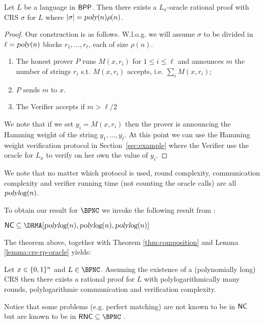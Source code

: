 \begin{lemma}
	\label{lemma:crs-rp-oracle}
	Let $L$ be a language in ${\mathsf{BPP}}$. Then there exists a $L_x$-oracle rational proof with CRS $\sigma$ for $L$ where $|\sigma|={\textsl{poly}}(n) \rho(n)$. 
\end{lemma}
\begin{proof}
Our construction is as follows. W.l.o.g. we will assume $\sigma$ to be divided in 
$\ell={\textsl{poly}}(n)$  blocks  $r_1,...,r_\ell$, each of size $\rho(n)$. 
\begin{enumerate}
\item The honest prover $P$ runs $M(x,r_i)$ for $1 \leq i \leq \ell$ and announces $m$ 
the number of strings $r_i$ s.t. $M(x,r_i)$ accepts, i.e. $\sum_i M(x,r_i)$; 
\item $P$ sends $m$ to $x$.
\item The Verifier accepts if $m>\ell/2$
\end{enumerate}
We note that if we set $y_i=M(x,r_i)$ then the prover is announcing the Hamming weight of the string $y_1,\ldots,y_\ell$. At this point we can use the Hamming weight verification protocol in Section~\ref{sec:example} where the Verifier use the oracle for 
$L_x$ to verify on her own the value of $y_i$. 
\end{proof}
We note that no matter which protocol is used, round complexity, communication complexity and verifier running time (not counting the oracle calls) are all ${\textsl{polylog}}(n)$. 

To obtain our result for $\BPNC$ we invoke the following result from \cite{ratsumchecks}:
\begin{theorem}
	$\NC \subseteq \DRMA[\polylog(n), \polylog(n), \polylog(n)]$
\end{theorem}
The theorem above, together with Theorem \ref{thm:composition} 
and Lemma \ref{lemma:crs-rp-oracle} yields:
\begin{corollary}
	Let $x \in \{0, 1\}^n$ and $L \in \BPNC$. Assuming the existence of a (polynomially long) CRS then there exists a rational proof for $L$
	with polylogarithmically many rounds, polylogarithmic communication and verification complexity.
\end{corollary}
Notice that some problems (e.g. perfect matching) are not known to be in ${\mathsf{NC}}$ but are known to be in $\RNC \subseteq \BPNC$ \cite{karp1985constructing}.
